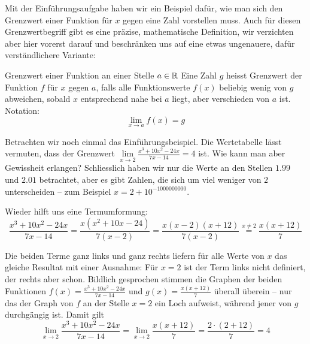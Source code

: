 \begin{LA}
        
\end{LA}
\newpage
Mit der Einführungsaufgabe haben wir ein Beispiel dafür, wie man sich den Grenzwert einer Funktion für $x$ gegen eine Zahl vorstellen muss. Auch für diesen Grenzwertbegriff gibt es eine präzise, mathematische Definition, wir verzichten aber hier vorerst darauf und beschränken uns auf eine etwas ungenauere, dafür verständlichere Variante:

\begin{definition}
    {Grenzwert einer Funktion an einer Stelle $a\in \mathbb{R}$}{}
Eine Zahl $g$ heisst Grenzwert der Funktion $f$ für $x$ gegen $a$, falls alle Funktionswerte $f(x)$ beliebig wenig von $g$ abweichen, sobald $x$ entsprechend nahe bei $a$ liegt, aber verschieden von $a$ ist.
Notation:
$$\lim_{x\rightarrow a} f(x) = g$$
\end{definition}


Betrachten wir noch einmal das Einführungsbeispiel. Die Wertetabelle lässt vermuten, dass der Grenzwert $\lim\limits_{x\rightarrow 2} \frac{x^3+10x^2-24x}{7x-14} =4$ ist. Wie kann man aber Gewissheit erlangen? Schliesslich haben wir nur die Werte an den Stellen $1.99$ und $2.01$ betrachtet, aber es gibt Zahlen, die sich um viel weniger von $2$ unterscheiden – zum Beispiel $x=2+10^{-1000000000}$. 

Wieder hilft uns eine Termumformung:
$$\frac{x^3+10x^2-24x}{7x-14} = \frac{x(x^2+10x-24)}{7(x-2)} = \frac{x(x-2)(x+12)}{7(x-2)}\stackrel{x\neq 2}{=}\frac{x(x+12)}{7}$$

Die beiden Terme ganz links und ganz rechts liefern für alle Werte von $x$ das gleiche Resultat mit einer Ausnahme: Für $x=2$ ist der Term links nicht definiert, der rechts aber schon. Bildlich gesprochen stimmen die Graphen der beiden Funktionen $f(x)=\frac{x^3+10x^2-24x}{7x-14}$ und $g(x)=\frac{x(x+12)}{7}$ überall überein – nur das der Graph von $f$ an der Stelle $x=2$ ein Loch aufweist, während jener von $g$ durchgängig ist. 
Damit gilt
$$\lim_{x\rightarrow2} \frac{x^3+10x^2-24x}{7x-14} = \lim_{x\rightarrow2} \frac{x(x+12)}{7} =\frac{2\cdot (2+12)}{7} = 4$$

